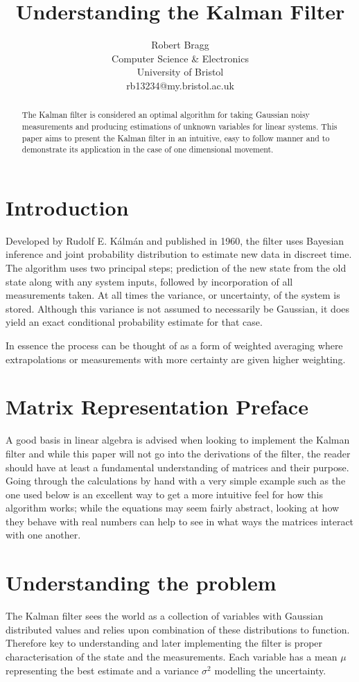 \documentclass[12pt]{article}
\title{Understanding the Kalman Filter}
\author{Robert Bragg \\ Computer Science \& Electronics \\ University of Bristol \\ rb13234@my.bristol.ac.uk}
\date{}
\begin{document}
\twocolumn
\maketitle
\begin{abstract}
The Kalman filter is considered an optimal algorithm for taking Gaussian noisy measurements and producing estimations of unknown variables for linear systems. This paper aims to present the Kalman filter in an intuitive, easy to follow manner and to demonstrate its application in the case of one dimensional movement.
\end{abstract}

\section{Introduction}
Developed by Rudolf E. Kálmán and published in 1960\cite{kalman1960new}, the filter uses Bayesian inference and joint probability distribution to estimate new data in discreet time. The algorithm uses two principal steps; prediction of the new state from the old state along with any system inputs, followed by incorporation of all measurements taken. At all times the variance, or uncertainty, of the system is stored. Although this variance is not assumed to necessarily be Gaussian, it does yield an exact conditional probability estimate for that case. \par
	In essence the process can be thought of as a form of weighted averaging where extrapolations or measurements with more certainty are given higher weighting. 

\section{Matrix Representation Preface}
A good basis in linear algebra is advised when looking to implement the Kalman filter and while this paper will not go into the derivations of the filter, the reader should have at least a fundamental understanding of matrices and their purpose. Going through the calculations by hand with a very simple example such as the one used below is an excellent way to get a more intuitive feel for how this algorithm works; while the equations may seem fairly abstract, looking at how they behave with real numbers can help to see in what ways the matrices interact with one another.

\section{Understanding the problem}
The Kalman filter sees the world as a collection of variables with Gaussian distributed values and relies upon combination of these distributions to function. Therefore key to understanding and later implementing the filter is proper characterisation of the state and the measurements. Each variable has a mean \(\mu\) representing the best estimate and a variance \(\sigma^2\) modelling the uncertainty. \par
\end{document}
